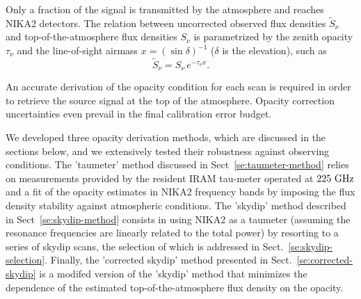 %
%

Only a fraction of the signal is transmitted by the atmosphere and
reaches NIKA2 detectors. 
The relation between uncorrected observed flux densities
$\tilde{S}_{\nu}$ and top-of-the-atmosphere flux densities $S_{\nu}$
is parametrized by the zenith opacity $\tau_{\nu}$
and the line-of-sight airmass $x = \left(\sin\delta\right)^{-1}$ ($\delta$ is the elevation), such as
\begin{equation}
\tilde{S}_{\nu} = S_{\nu} \, e^{-\tau_{\nu}  x}.
\label{eq:uncorr_flux}
\end{equation}

An accurate derivation of the opacity condition for each scan is
required in order to retrieve the source signal at the top of the
atmosphere. Opacity correction uncertainties even prevail in the
final calibration error budget.

We developed three opacity derivation methods, which are discussed in
the sections below, and we extensively tested their robustness against
observing conditions. The 'taumeter' method discussed in
Sect~\ref{se:taumeter-method} relies on measurements provided by the
resident IRAM tau-meter operated at $225~\rm{GHz}$ and a fit of the
opacity estimates in NIKA2 frequency bands by imposing the flux
density stability against atmospheric conditions. The 'skydip' method
described in Sect~\ref{se:skydip-method} consists in using NIKA2 as a
taumeter (assuming the resonance frequencies are linearly related to
the total power) by resorting to a series of skydip scans, the
selection of which is addressed in
Sect.~\ref{se:skydip-selection}. Finally, the 'corrected skydip'
method presented in Sect.~\ref{se:corrected-skydip} is a modifed
version of the 'skydip' method that minimizes the dependence of the
estimated top-of-the-atmosphere flux density on the opacity.\\


